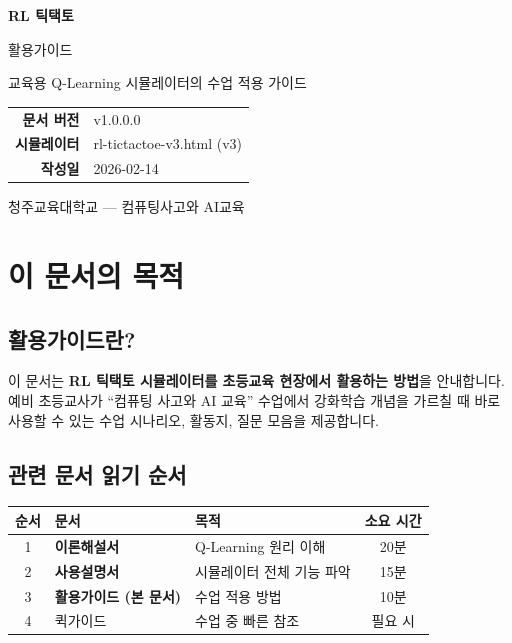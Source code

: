 \documentclass[11pt,a4paper]{article}
\begin{document}
\begin{titlepage}
\centering
\vspace*{3cm}
{\fontsize{48pt}{50pt}\selectfont {}}
\vspace{1cm}

{\Huge\bfseries\color{mainblue} RL 틱택토}
\vspace{0.3cm}

{\LARGE\color{darkbrown} 활용가이드}
\vspace{1.5cm}

{\large 교육용 Q-Learning 시뮬레이터의 수업 적용 가이드}
\vspace{3cm}

\begin{tabular}{rl}
\textbf{문서 버전} & v1.0.0.0 \\
\textbf{시뮬레이터} & rl-tictactoe-v3.html (v3) \\
\textbf{작성일} & 2026-02-14 \\
\end{tabular}
\vfill
{\small\color{lightbrown} 청주교육대학교 — 컴퓨팅사고와 AI교육}
\end{titlepage}

\tableofcontents
\newpage

\section{이 문서의 목적}

\subsection{활용가이드란?}

이 문서는 \textbf{RL 틱택토 시뮬레이터를 초등교육 현장에서 활용하는 방법}을 안내합니다. 예비 초등교사가 ``컴퓨팅 사고와 AI 교육'' 수업에서 강화학습 개념을 가르칠 때 바로 사용할 수 있는 수업 시나리오, 활동지, 질문 모음을 제공합니다.

\subsection{관련 문서 읽기 순서}

\begin{center}
\renewcommand{\arraystretch}{1.4}
\begin{tabular}{|c|l|l|c|}
\hline
\rowcolor{tableheader}
\textbf{순서} & \textbf{문서} & \textbf{목적} & \textbf{소요 시간} \\
\hline
1 & \textbf{이론해설서} & Q-Learning 원리 이해 & 20분 \\
\hline
2 & \textbf{사용설명서} & 시뮬레이터 전체 기능 파악 & 15분 \\
\hline
3 & \textbf{활용가이드 (본 문서)} & 수업 적용 방법 & 10분 \\
\hline
4 & 퀵가이드 & 수업 중 빠른 참조 & 필요 시 \\
\hline
\end{tabular}
\end{center}
\end{document}
